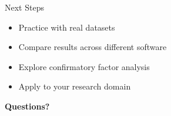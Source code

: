 \documentclass[aspectratio=169]{beamer}
\begin{document}
\begin{frame}{Next Steps}
  \begin{itemize}
    \item Practice with real datasets
    \item Compare results across different software
    \item Explore confirmatory factor analysis
    \item Apply to your research domain
  \end{itemize}
  
  \vspace{1em}
  \centering
  \Large\textbf{Questions?}
\end{frame}
\end{document}
